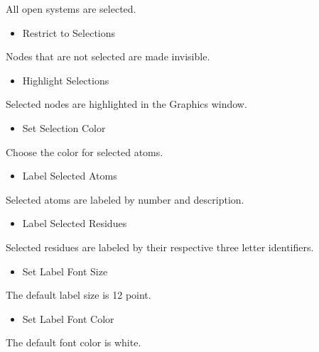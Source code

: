 \documentclass[letterpaper,11pt,english]{sphinxmanual}
\begin{document}
All open systems are selected.
\begin{itemize}
\item {} 
Restrict to Selections

\end{itemize}

Nodes that are not selected are made invisible.
\begin{itemize}
\item {} 
Highlight Selections

\end{itemize}

Selected nodes are highlighted in the Graphics window.
\begin{itemize}
\item {} 
Set Selection Color

\end{itemize}

Choose the color for selected atoms.
\begin{itemize}
\item {} 
Label Selected Atoms

\end{itemize}

Selected atoms are labeled by number and description.
\begin{itemize}
\item {} 
Label Selected Residues

\end{itemize}

Selected residues are labeled by their respective three letter identifiers.
\begin{itemize}
\item {} 
Set Label Font Size

\end{itemize}

The default label size is 12 point.
\begin{itemize}
\item {} 
Set Label Font Color

\end{itemize}

The default font color is white.
\end{document}
